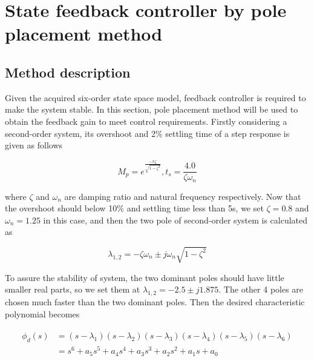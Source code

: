 \documentclass[hyperref]{article}
\theoremstyle{nonumberplain}
\begin{document}
	\section{State feedback controller by pole placement method}
	
	\subsection{Method description}
	
	\hspace{1.0em}
	Given the acquired six-order state space model, feedback controller is required to make the system stable. In this section, pole placement method will be used to obtain the feedback gain to meet control requirements. Firstly considering a second-order system, its overshoot and 2\% settling time of a step response is given as follows
	
	\begin{equation}
	M_{p}=e^{\frac{-\pi \zeta }{\sqrt{1-\zeta ^{2}}}}, t_{s}=\frac{4.0}{\zeta \omega _{n}}
	\label{eq6}
	\end{equation}
	
	where $\zeta$ and $\omega_{n}$ are damping ratio and natural frequency respectively. Now that the overshoot should below 10\% and settling time less than 5s, we set $\zeta=0.8$ and $\omega_{n}=1.25$ in this case, and then the two pole of second-order system is calculated as
	
	\begin{equation}
	\lambda _{1,2}=-\zeta \omega _{n}\pm j\omega _{n}\sqrt{1-\zeta ^{2}}
	\label{eq7}
	\end{equation}
	
	To assure the stability of system, the two dominant poles should have little smaller real parts, so we set them at $\lambda_{1,2}=-2.5\pm j1.875$. The other 4 poles are chosen much faster than the two dominant poles. Then the desired characteristic polynomial becomes
	
	\begin{equation}
	\begin{split}
	\begin{aligned}
		\phi _{d}(s)&=(s-\lambda _{1})(s-\lambda _{2})(s-\lambda _{3})(s-\lambda _{4})(s-\lambda _{5})(s-\lambda _{6})\\
		&=s^{6}+a_{5}s^{5}+a_{4}s^{4}+a_{3}s^{3}+a_{2}s^{2}+a_{1}s+a_{0}
	\end{aligned}
	\end{split}
	\label{eq8}
	\end{equation}
	
\end{document}

